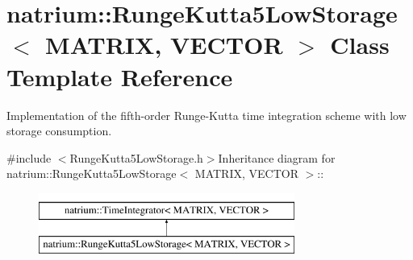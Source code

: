 \hypertarget{classnatrium_1_1RungeKutta5LowStorage}{
\section{natrium::RungeKutta5LowStorage$<$ MATRIX, VECTOR $>$ Class Template Reference}
\label{classnatrium_1_1RungeKutta5LowStorage}
}


Implementation of the fifth-\/order Runge-\/Kutta time integration scheme with low storage consumption.  


{\ttfamily \#include $<$RungeKutta5LowStorage.h$>$}Inheritance diagram for natrium::RungeKutta5LowStorage$<$ MATRIX, VECTOR $>$::\begin{figure}[H]
\begin{center}
\leavevmode
\includegraphics[height=2cm]{classnatrium_1_1RungeKutta5LowStorage}
\end{center}
\end{figure}
